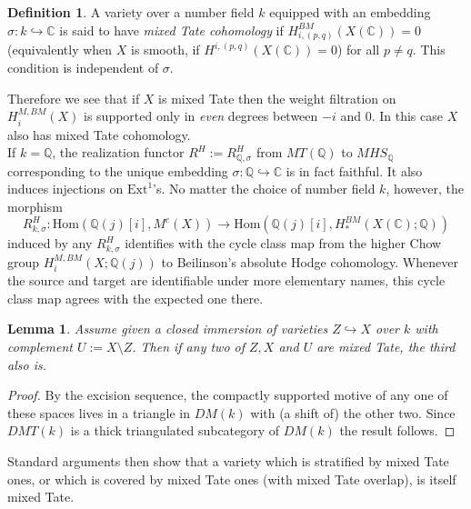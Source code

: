 \documentclass[11pt]{amsart}
\newtheorem{lem}[thm]{Lemma}
\theoremstyle{definition}
\newtheorem{defn}[thm]{Definition}
\theoremstyle{remark}
\newcommand{\Hom}{\mathrm{Hom}}
\numberwithin{equation}{section}
\begin{document}
\begin{defn}
    A variety over a number field $k$ equipped with an embedding $\sigma: k \hookrightarrow \mathbb{C}$ is said to have \textit{mixed Tate cohomology} if $H_{i, (p, q)}^{BM}(X(\mathbb{C})) = 0$ (equivalently when $X$ is smooth, if $H^{i, (p, q)}(X(\mathbb{C})) = 0$) for all $p \neq q$. This condition is independent of $\sigma$.
\end{defn}

Therefore we see that if $X$ is mixed Tate then the weight filtration on $H_i^{M, BM}(X)$ is supported only in \textit{even} degrees between $-i$ and $0$. In this case $X$ also has mixed Tate cohomology.\\

If $k = \mathbb{Q}$, the realization functor $R^H := R^H_{\mathbb{Q}, \sigma}$ from $MT(\mathbb{Q})$ to  $MHS_\mathbb{Q}$ corresponding to the unique embedding $\sigma: \mathbb{Q} \hookrightarrow \mathbb{C}$ is in fact faithful. It also induces injections on $\text{Ext}^1$'s. No matter the choice of number field $k$, however, the morphism \begin{equation}
    R_{k, \sigma}^H: \Hom(\mathbb{Q}(j)[i], M^c(X)) \rightarrow \Hom(\mathbb{Q}(j)[i], H_*^{BM}(X(\mathbb{C}); \mathbb{Q})) 
\end{equation} induced by any $R^H_{k, \sigma}$ identifies with the cycle class map from the higher Chow group $H_i^{M, BM}(X; \mathbb{Q}(j))$ to Beilinson's absolute Hodge cohomology. Whenever the source and target are identifiable under more elementary names, this cycle class map agrees with the expected one there.

\begin{lem}\label{2-of-3 mixed tate}
   Assume given a closed immersion of varieties $Z \hookrightarrow X$ over $k$ with complement $U := X \setminus Z$. Then if any two of $Z, X$ and $U$ are mixed Tate, the third also is.
\end{lem}

\begin{proof}
    By the excision sequence, the compactly supported motive of any one of these spaces lives in a triangle in $DM(k)$ with (a shift of) the other two. Since $DMT(k)$ is a thick triangulated subcategory of $DM(k)$ the result follows.
\end{proof}

Standard arguments then show that a variety which is stratified by mixed Tate ones, or which is covered by mixed Tate ones (with mixed Tate overlap), is itself mixed Tate.
\end{document}
